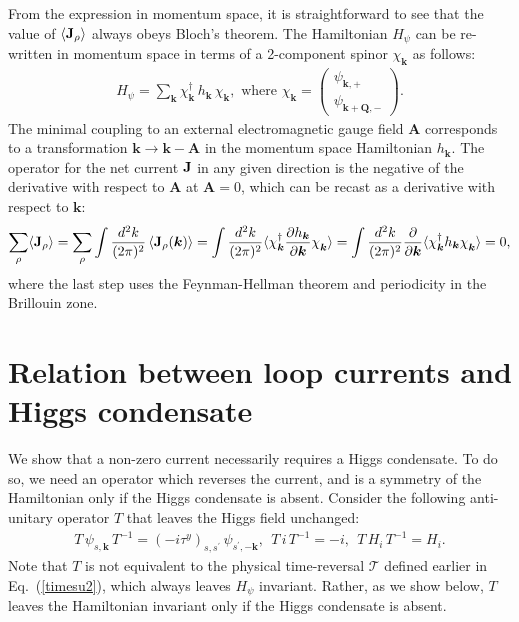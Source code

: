 \documentclass[aps,prb,preprint,onecolumn,citeautoscript,superscriptaddress,footinbib,
eqsecnum]{revtex4-1}
\def\bea{\begin{eqnarray}}
\def\eea{\end{eqnarray}}
\def \k{{\bm k}}
\def \Q{{\bm Q}}
\begin{document}
From the expression in momentum space, it is straightforward to see that the value of $\langle {\bf J}_\rho \rangle$ always obeys Bloch's theorem. The Hamiltonian $H_{\psi}$ can be re-written in momentum space in terms of a 2-component spinor $\chi_{\k}$ as follows:
\bea
H_{\psi} = \sum_{\k} \chi_{\k}^\dagger \, h_{\k} \, \chi_{\k}, \text{ where }
\chi_{\k} = \begin{pmatrix}
\psi_{\k,+} \\
\psi_{\k + \Q, - }
\end{pmatrix}.
\eea
The minimal coupling to an external electromagnetic gauge field $\bm{A}$ corresponds to a transformation $\k \rightarrow \k - \bm{A}$ in the momentum space Hamiltonian $h_{\k}$. The operator for the net current ${\bf J}$ in any given direction is the negative of the derivative with respect to $\bm{A}$ at $\bm A = 0$, which can be recast as a derivative with respect to $\k$:
\bea
\sum_{\rho} \langle {\bf J}_\rho \rangle = 
\sum_{\rho} \int \frac{d^2 k}{(2\pi)^2}\, \langle {\bf J}_{\rho}(\k) \rangle = \int \frac{d^2 k}{(2\pi)^2} \langle \chi_{\k}^\dagger \frac{\partial h_{\k}}{\partial \k} \chi_{\k}^{\vphantom\dagger}\rangle = \int \frac{d^2 k}{(2\pi)^2} \frac{\partial}{\partial \k} \langle \chi_{\k}^\dagger h_{\k} \chi_{\k}^{\vphantom\dagger}\rangle = 0,
\eea
where the last step uses the Feynman-Hellman theorem and periodicity in the Brillouin zone.

\section{Relation between loop currents and Higgs condensate}
\label{app:Higgs}

We show that a non-zero current necessarily requires a Higgs condensate. To do so, we need an operator which reverses the current, and is a symmetry of the Hamiltonian only if the Higgs condensate is absent. Consider the following anti-unitary operator $T$ that leaves the Higgs field unchanged:
\bea
T \, \psi_{s,\k} \, T^{-1} = (- i \tau^y)_{s, s^{\prime}} \, \psi_{s^{\prime},-\k}, ~~ T \, i  \,T^{-1} = -i, ~~ T \, H_i  \,T^{-1} = H_i.
\eea
Note that $T$ is not equivalent to the physical time-reversal $\mathcal{T}$ defined earlier in Eq.~(\ref{timesu2}), which always leaves $H_{\psi}$ invariant. Rather, as we show below, $T$ leaves the Hamiltonian invariant only if the Higgs condensate is absent.
\end{document}
